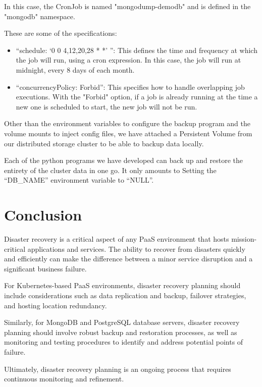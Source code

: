 In this case, the CronJob is named "mongodump-demodb" and is defined in the "mongodb" namespace. 

These are some of the specifications: 
\begin{itemize}[label={--}]
\item “schedule: ‘0 0 4,12,20,28 * *’ ”: This defines the time and frequency at which the job will run, using a cron expression. In this case, the job will run at midnight, every 8 days of each month. 
\item  “concurrencyPolicy: Forbid”: This specifies how to handle overlapping job executions. With the "Forbid" option, if a job is already running at the time a new one is scheduled to start, the new job will not be run. 
\end{itemize}

Other than the environment variables to configure the backup program and the volume mounts to inject config files, we have attached a Persistent Volume from our distributed storage cluster to be able to backup data locally. 

Each of the python programs we have developed can back up and restore the entirety of the cluster data in one go. It only amounts to Setting the “DB\_NAME” environment variable to “NULL”. 

\section*{Conclusion}
Disaster recovery is a critical aspect of any PaaS environment that hosts mission-critical applications and services. The ability to recover from disasters quickly and efficiently can make the difference between a minor service disruption and a significant business failure. 

For Kubernetes-based PaaS environments, disaster recovery planning should include considerations such as data replication and backup, failover strategies, and hosting location redundancy.  

Similarly, for MongoDB and PostgreSQL database servers, disaster recovery planning should involve robust backup and restoration processes, as well as monitoring and testing procedures to identify and address potential points of failure.  

Ultimately, disaster recovery planning is an ongoing process that requires continuous monitoring and refinement. 